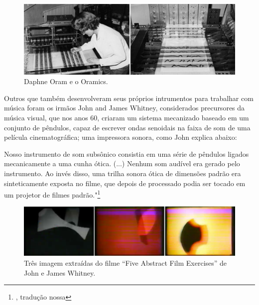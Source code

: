 \begin{figure}
    \caption{\label{oram}Daphne Oram e o Oramics.}
    
        \includegraphics[width=1\linewidth]{pictures/cap2/oramics}
    
\end{figure}


Outros que também desenvolveram seus próprios intrumentos para trabalhar com música foram os irmãos John and James Whitney, considerados precursores da música visual, que nos anos 60, criaram um sistema mecanizado baseado em um conjunto de pêndulos, capaz de escrever ondas senoidais na faixa de som de uma película cinematográfica; uma impressora sonora, como John explica abaixo:

\begin{citacao}
Nosso instrumento de som subsônico consistia em uma série de pêndulos ligados mecanicamente a uma cunha ótica. (...) Nenhum som audível era gerado pelo instrumento. Ao invés disso, uma trilha sonora ótica de dimensões padrão era sinteticamente exposta no filme, que depois de processado podia ser tocado em um projetor de filmes padrão."\footnote{\cite[p. 152]{Whitney1980}, tradução nossa} 
\end{citacao}

\begin{figure}
    \caption{\label{witney}Três imagem extraídas do filme ``Five Abstract Film Exercises'' de John e James Whitney.}
    
        \includegraphics[width=1\linewidth]{pictures/cap2/witney}
    
\end{figure}


